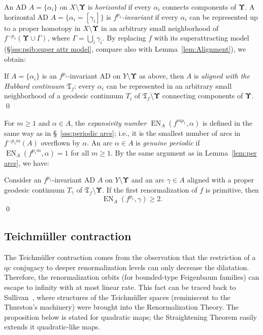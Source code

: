 \documentclass{amsart}
\newcommand{\Hub}{{\mathfrak T}}
\newcommand{\ExpN}{{\operatorname{EN}}}
\newcommand{\bUpsilon}{{\boldsymbol {\Upsilon} }}
\newcommand{\1}{{\mathbb 1 }}
\begin{document}
An AD $A=\{\alpha_i\}$ on $X\setminus \bUpsilon$ is \emph{horizontal} if every $\alpha_i$ connects components of $\bUpsilon$. A horizontal AD $A=\{\alpha_i=[\gamma_i]\}$ is \emph{$f^{p_1}$-invariant} if every $\alpha_i$ can be represented up to a proper homotopy in $X\setminus \bUpsilon$ in an arbitrary small neighborhood of $f^{-p_1}\left(\bUpsilon\cup \Gamma \right)$, where $\Gamma=\bigcup_i \gamma_i$.  By replacing $f$ with its superattracting model (\S\ref{sss:psib:super attr model}, compare also with Lemma~\ref{lem:Alignment}), we obtain:


\begin{lem}[Alignment with $\Hub_f$]\label{lem:Alignment:Ups} If $A=\{\alpha_i\}$ is an $f^{p_1}$-invariant AD on $Y\setminus \bUpsilon$ as above, then $A$ is \emph{aligned with the Hubbard continuum} $\Hub_f$: every $\alpha_i$ can be represented in an arbitrary small neighborhood of a geodesic continuum $T_i$ of $\Hub_f\setminus \bUpsilon$ connecting components of $\bUpsilon.$\qed
\end{lem}

For $m\ge 1$ and $\alpha\in A$, the \emph{expansivity number} $\ExpN_A(f^{mp_1}, \alpha)$ is defined in the same way as in \S~\ref{sss:periodic arcs}; i.e., it is the smallest number of arcs in $f^{-p_1m}\left( A\right)$ overflown by $\alpha$.  An arc $\alpha\in A$ is \emph{genuine periodic} if $\ExpN_A(f^{p_1m},\alpha)=1$ for all $m\ge 1$. By the same argument as in Lemma~\ref{lem:per arcs}, we have:



\begin{lem}[Expansivity of {$  f\mid [\Hub_f\setminus \bUpsilon]$}] 
\label{lem:per arcs:ups}
Consider an $f^{p_1}$-invariant AD $A$ on $Y\setminus \bUpsilon$ and an arc $\gamma\in A$ aligned with a proper geodesic continuum $T_\gamma$ of $\Hub_f\setminus \bUpsilon$. If the first renormalization of $f$ is primitive, then
\begin{equation}
\label{eq:lem:per arcs:ups} \ExpN_A(f^{p_1}, \gamma) \ge 2.
\end{equation}\qed
\end{lem}
 




\subsection{Teichm\"uller contraction}
\label{ss:Teichm contra} The Teichm\"uller contraction comes from the observation that the restriction of a qc conjugacy to deeper renormalization levels can only decrease the dilatation. Therefore, the renormalization orbits (for bounded-type Feigenbaum families) can escape to infinity with at most linear rate. This fact can be traced back to Sullivan~\cite{S:Berkeley}, where structures of the Teichm\"uller spaces (reminiscent to the Thurston's machinery) were brought into the Renormalization Theory.  The proposition below is stated for quadratic maps; the Straightening Theorem easily extends it quadratic-like maps.
\end{document}
